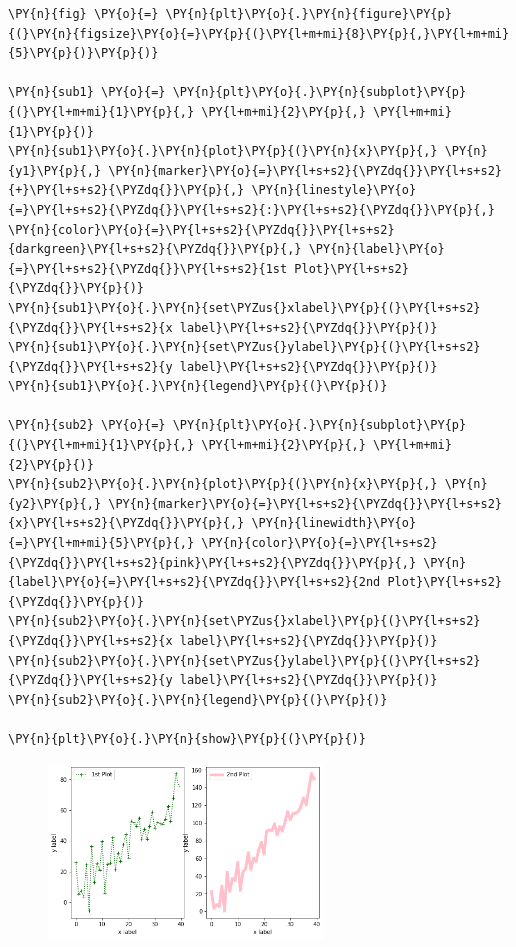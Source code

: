 \begin{tcolorbox}[breakable, size=fbox, boxrule=1pt, pad at break*=1mm,colback=cellbackground, colframe=cellborder]
\begin{Verbatim}[commandchars=\\\{\}]
\PY{n}{fig} \PY{o}{=} \PY{n}{plt}\PY{o}{.}\PY{n}{figure}\PY{p}{(}\PY{n}{figsize}\PY{o}{=}\PY{p}{(}\PY{l+m+mi}{8}\PY{p}{,}\PY{l+m+mi}{5}\PY{p}{)}\PY{p}{)}
	
\PY{n}{sub1} \PY{o}{=} \PY{n}{plt}\PY{o}{.}\PY{n}{subplot}\PY{p}{(}\PY{l+m+mi}{1}\PY{p}{,} \PY{l+m+mi}{2}\PY{p}{,} \PY{l+m+mi}{1}\PY{p}{)}
\PY{n}{sub1}\PY{o}{.}\PY{n}{plot}\PY{p}{(}\PY{n}{x}\PY{p}{,} \PY{n}{y1}\PY{p}{,} \PY{n}{marker}\PY{o}{=}\PY{l+s+s2}{\PYZdq{}}\PY{l+s+s2}{+}\PY{l+s+s2}{\PYZdq{}}\PY{p}{,} \PY{n}{linestyle}\PY{o}{=}\PY{l+s+s2}{\PYZdq{}}\PY{l+s+s2}{:}\PY{l+s+s2}{\PYZdq{}}\PY{p}{,} \PY{n}{color}\PY{o}{=}\PY{l+s+s2}{\PYZdq{}}\PY{l+s+s2}{darkgreen}\PY{l+s+s2}{\PYZdq{}}\PY{p}{,} \PY{n}{label}\PY{o}{=}\PY{l+s+s2}{\PYZdq{}}\PY{l+s+s2}{1st Plot}\PY{l+s+s2}{\PYZdq{}}\PY{p}{)}
\PY{n}{sub1}\PY{o}{.}\PY{n}{set\PYZus{}xlabel}\PY{p}{(}\PY{l+s+s2}{\PYZdq{}}\PY{l+s+s2}{x label}\PY{l+s+s2}{\PYZdq{}}\PY{p}{)}
\PY{n}{sub1}\PY{o}{.}\PY{n}{set\PYZus{}ylabel}\PY{p}{(}\PY{l+s+s2}{\PYZdq{}}\PY{l+s+s2}{y label}\PY{l+s+s2}{\PYZdq{}}\PY{p}{)}
\PY{n}{sub1}\PY{o}{.}\PY{n}{legend}\PY{p}{(}\PY{p}{)}
	
\PY{n}{sub2} \PY{o}{=} \PY{n}{plt}\PY{o}{.}\PY{n}{subplot}\PY{p}{(}\PY{l+m+mi}{1}\PY{p}{,} \PY{l+m+mi}{2}\PY{p}{,} \PY{l+m+mi}{2}\PY{p}{)}
\PY{n}{sub2}\PY{o}{.}\PY{n}{plot}\PY{p}{(}\PY{n}{x}\PY{p}{,} \PY{n}{y2}\PY{p}{,} \PY{n}{marker}\PY{o}{=}\PY{l+s+s2}{\PYZdq{}}\PY{l+s+s2}{x}\PY{l+s+s2}{\PYZdq{}}\PY{p}{,} \PY{n}{linewidth}\PY{o}{=}\PY{l+m+mi}{5}\PY{p}{,} \PY{n}{color}\PY{o}{=}\PY{l+s+s2}{\PYZdq{}}\PY{l+s+s2}{pink}\PY{l+s+s2}{\PYZdq{}}\PY{p}{,} \PY{n}{label}\PY{o}{=}\PY{l+s+s2}{\PYZdq{}}\PY{l+s+s2}{2nd Plot}\PY{l+s+s2}{\PYZdq{}}\PY{p}{)}
\PY{n}{sub2}\PY{o}{.}\PY{n}{set\PYZus{}xlabel}\PY{p}{(}\PY{l+s+s2}{\PYZdq{}}\PY{l+s+s2}{x label}\PY{l+s+s2}{\PYZdq{}}\PY{p}{)}
\PY{n}{sub2}\PY{o}{.}\PY{n}{set\PYZus{}ylabel}\PY{p}{(}\PY{l+s+s2}{\PYZdq{}}\PY{l+s+s2}{y label}\PY{l+s+s2}{\PYZdq{}}\PY{p}{)}
\PY{n}{sub2}\PY{o}{.}\PY{n}{legend}\PY{p}{(}\PY{p}{)}
	
\PY{n}{plt}\PY{o}{.}\PY{n}{show}\PY{p}{(}\PY{p}{)}
\end{Verbatim}
\end{tcolorbox}
\newpage
\begin{figure} [h]
	\centering
	\includegraphics[width=0.65\textwidth]{figures/matplotlib_25_0.png}
\end{figure}

